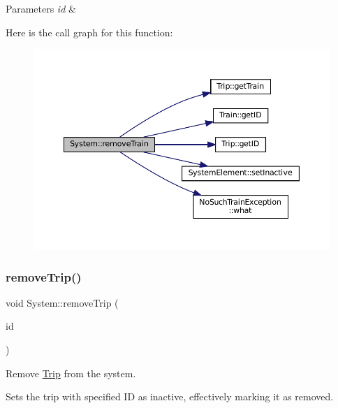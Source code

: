 \begin{DoxyParams}{Parameters}
{\em id} & \\
\hline
\end{DoxyParams}
Here is the call graph for this function\+:
\nopagebreak
\begin{figure}[H]
\begin{center}
\leavevmode
\includegraphics[width=350pt]{classSystem_ab36039b5b1cffc88356398bac8b4f79b_cgraph}
\end{center}
\end{figure}
\mbox{\label{classSystem_a38046fbc01e62b7ff06799c2f8bc8ef6}} 
\subsubsection{\texorpdfstring{remove\+Trip()}{removeTrip()}}
{\footnotesize\ttfamily void System\+::remove\+Trip (\begin{DoxyParamCaption}\item[{\mbox{\hyperlink{project__utils_8h_a8f3a969054ad2200720b96e7e23dd4e1}{id\+\_\+t}}}]{id }\end{DoxyParamCaption})}



Remove \mbox{\hyperlink{classTrip}{Trip}} from the system. 

Sets the trip with specified ID as inactive, effectively marking it as removed.


